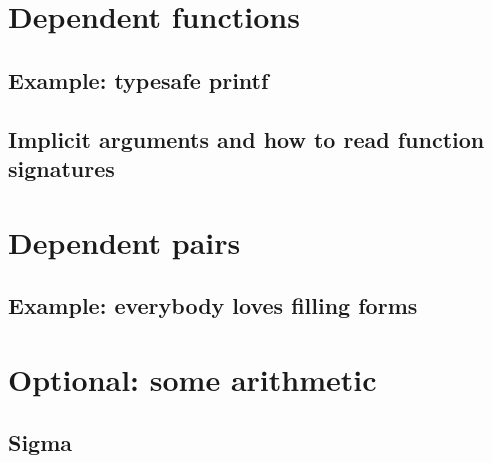 \documentclass{beamer}
\begin{document}
\section{Dependent functions}


\subsection{Example: typesafe printf}

\subsection{Implicit arguments and how to read function signatures}

\section{Dependent pairs}

\subsection{Example: everybody loves filling forms}

\section{Optional: some arithmetic}

\subsection{Sigma}
\end{document}
